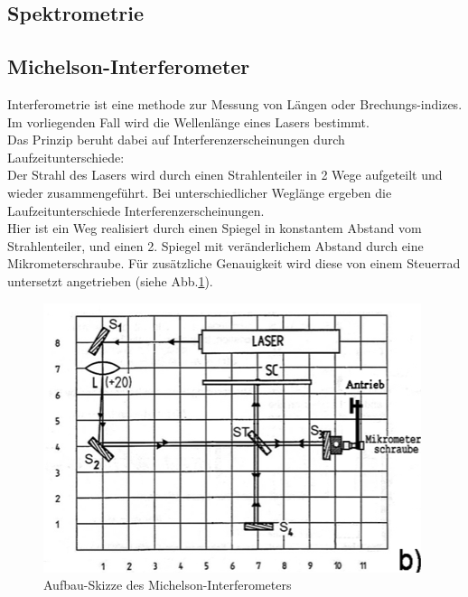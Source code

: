 \documentclass[12pt,a4paper]{article}
\begin{document}
\begin{multicols}{2}
\subsection{Spektrometrie}


\subsection{Michelson-Interferometer}

Interferometrie ist eine methode zur Messung von Längen oder Brechungs-indizes.\\
Im vorliegenden Fall wird die Wellenlänge eines Lasers bestimmt.\\
Das Prinzip beruht dabei auf Interferenzerscheinungen durch Laufzeitunterschiede:\\
Der Strahl des Lasers wird durch einen Strahlenteiler in 2 Wege aufgeteilt und wieder zusammengeführt. Bei unterschiedlicher Weglänge ergeben die Laufzeitunterschiede Interferenzerscheinungen.\\
Hier ist ein Weg realisiert durch einen Spiegel in konstantem Abstand vom Strahlenteiler, und einen 2. Spiegel mit veränderlichem Abstand durch eine Mikrometerschraube. Für zusätzliche Genauigkeit wird diese von einem Steuerrad untersetzt angetrieben (siehe Abb.\ref{fig:Skizze_Michelson}).

\begin{figure}[H]
	\centering
	\includegraphics[scale=1.1]{./data/Interferometer/Interferometer_skizze.png}
	\caption{Aufbau-Skizze des Michelson-Interferometers}
	\label{fig:Skizze_Michelson}
\end{figure}


\end{multicols}
\end{document}
